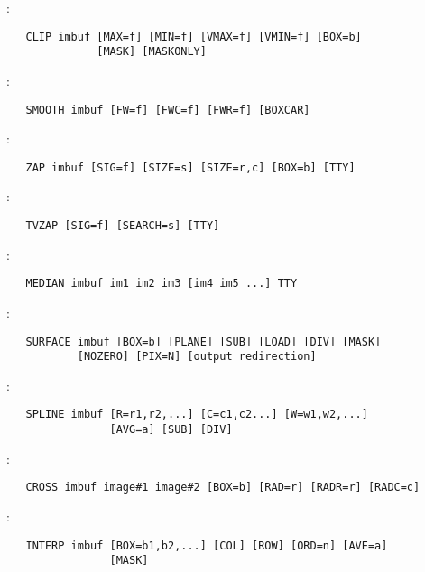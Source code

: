 \noindent {}:
\begin{verbatim}
   CLIP imbuf [MAX=f] [MIN=f] [VMAX=f] [VMIN=f] [BOX=b]
              [MASK] [MASKONLY]
\end{verbatim}

\noindent {}:
\begin{verbatim}
   SMOOTH imbuf [FW=f] [FWC=f] [FWR=f] [BOXCAR]
\end{verbatim}

\noindent {}:
\begin{verbatim}
   ZAP imbuf [SIG=f] [SIZE=s] [SIZE=r,c] [BOX=b] [TTY]
\end{verbatim}

\noindent {}:
\begin{verbatim}
   TVZAP [SIG=f] [SEARCH=s] [TTY]
\end{verbatim}

\noindent {}:
\begin{verbatim}
   MEDIAN imbuf im1 im2 im3 [im4 im5 ...] TTY
\end{verbatim}

\noindent {}:
\begin{verbatim}
   SURFACE imbuf [BOX=b] [PLANE] [SUB] [LOAD] [DIV] [MASK]
           [NOZERO] [PIX=N] [output redirection]
\end{verbatim}

\noindent {}:
\begin{verbatim}
   SPLINE imbuf [R=r1,r2,...] [C=c1,c2...] [W=w1,w2,...]
                [AVG=a] [SUB] [DIV]
\end{verbatim}

\noindent {}:
\begin{verbatim}
   CROSS imbuf image#1 image#2 [BOX=b] [RAD=r] [RADR=r] [RADC=c]
\end{verbatim}

\noindent {}:
\begin{verbatim}
   INTERP imbuf [BOX=b1,b2,...] [COL] [ROW] [ORD=n] [AVE=a]
                [MASK]
\end{verbatim}


